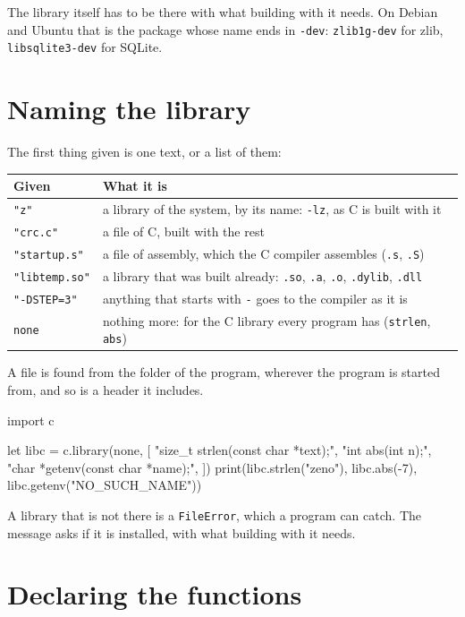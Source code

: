 The library itself has to be there with what building with it needs.
On Debian and Ubuntu that is the package whose name ends in
\verb|-dev|: \verb|zlib1g-dev| for zlib, \verb|libsqlite3-dev| for
SQLite.

\section{Naming the library}

The first thing given is one text, or a list of them:

\begin{center}
\begin{tabular}{lP{8.6cm}}
\toprule
Given & What it is \\
\midrule
\verb|"z"| & a library of the system, by its name: \verb|-lz|, as C is
  built with it \\
\verb|"crc.c"| & a file of C, built with the rest \\
\verb|"startup.s"| & a file of assembly, which the C compiler assembles
  (\verb|.s|, \verb|.S|) \\
\verb|"libtemp.so"| & a library that was built already: \verb|.so|,
  \verb|.a|, \verb|.o|, \verb|.dylib|, \verb|.dll| \\
\verb|"-DSTEP=3"| & anything that starts with \verb|-| goes to the
  compiler as it is \\
\verb|none| & nothing more: for the C library every program has
  (\verb|strlen|, \verb|abs|) \\
\bottomrule
\end{tabular}
\end{center}

A file is found from the folder of the program, wherever the program
is started from, and so is a header it includes.

\begin{zeno}[file=libc.zeno, dir=maths]
import c

let libc = c.library(none, [
    "size_t strlen(const char *text);",
    "int abs(int n);",
    "char *getenv(const char *name);",
])
print(libc.strlen("zeno"), libc.abs(-7), libc.getenv("NO_SUCH_NAME"))
\end{zeno}

A library that is not there is a \verb|FileError|, which a program can
catch. The message asks if it is installed, with what building with it
needs.

\section{Declaring the functions}

